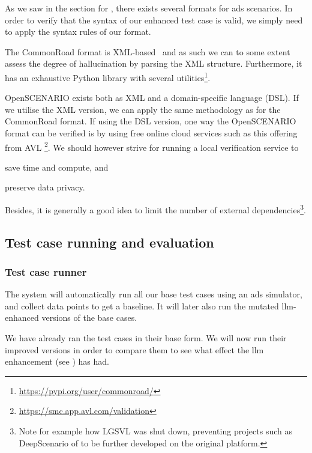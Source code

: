 As we saw in the section for , there exists several formats for
\acrshort{ads} scenarios. In order to verify that the syntax of our enhanced test
case is valid, we simply need to apply the syntax rules of our format.

The CommonRoad format is XML-based~\cite[720]{commonRoadOG} and as such we can
to some extent assess the degree of hallucination by parsing the XML structure.
Furthermore, it has an exhaustive Python library with several utilities\footnote{\url{https://pypi.org/user/commonroad/}}.

OpenSCENARIO exists both as XML and a domain-specific language (DSL). If we
utilise the XML version, we can apply the same methodology as for the CommonRoad
format. If using the DSL version, one way
the OpenSCENARIO format can be verified is by using free
online cloud services such as this offering from AVL
\footnote{\url{https://smc.app.avl.com/validation}}. We should however strive for
running a local verification service to \begin{inparaenum}
    \item save time and compute,
    and
    \item preserve data privacy.
\end{inparaenum}
Besides, it is generally a good idea to limit the number of external dependencies\footnote{Note for
    example how LGSVL\cite{lgsvl} was shut down, preventing projects such as DeepScenario of
    \citeauthor{DeepScenario} to be further developed on the original platform.}.

\subsection{Test case running and evaluation}

\subsubsection{Test case runner}

The system will automatically run all
our base test cases using an \acrshort{ads} simulator, and collect data points to get a baseline. It
will later also run the mutated \acrshort{llm}-enhanced versions of the base cases.

We have already ran the test cases in their base form. We will now run their
improved versions in order to compare them to see what effect the \acrshort{llm}
enhancement (see ) has had.

